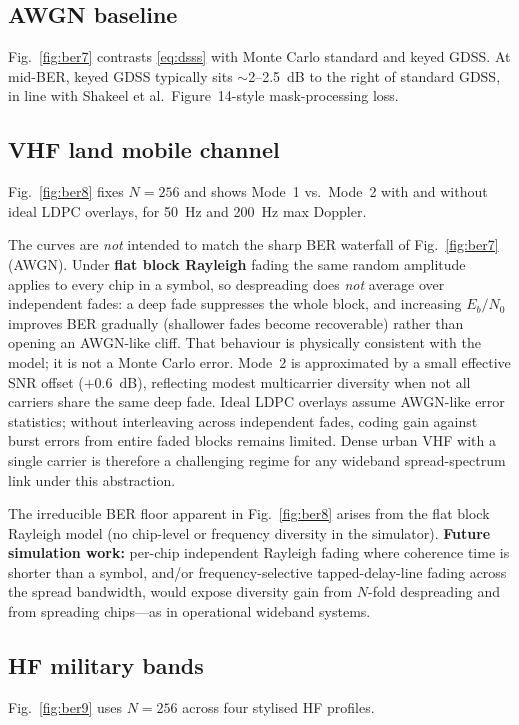 \documentclass[10pt,a4paper,twocolumn]{article}
\begin{document}
\subsection{AWGN baseline}
Fig.~\ref{fig:ber7} contrasts \eqref{eq:dsss} with Monte Carlo standard and keyed GDSS. At mid-BER, keyed GDSS typically sits $\sim$2--2.5~dB to the right of standard GDSS, in line with Shakeel et al.\ Figure~14-style mask-processing loss.

\subsection{VHF land mobile channel}
Fig.~\ref{fig:ber8} fixes $N{=}256$ and shows Mode~1 vs.\ Mode~2 with and without ideal LDPC overlays, for 50~Hz and 200~Hz max Doppler.

The curves are \emph{not} intended to match the sharp BER waterfall of Fig.~\ref{fig:ber7} (AWGN). Under \textbf{flat block Rayleigh} fading the same random amplitude applies to every chip in a symbol, so despreading does \emph{not} average over independent fades: a deep fade suppresses the whole block, and increasing $E_b/N_0$ improves BER gradually (shallower fades become recoverable) rather than opening an AWGN-like cliff. That behaviour is physically consistent with the model; it is not a Monte Carlo error. Mode~2 is approximated by a small effective SNR offset ($+0.6$~dB), reflecting modest multicarrier diversity when not all carriers share the same deep fade. Ideal LDPC overlays assume AWGN-like error statistics; without interleaving across independent fades, coding gain against burst errors from entire faded blocks remains limited. Dense urban VHF with a single carrier is therefore a challenging regime for any wideband spread-spectrum link under this abstraction.

The irreducible BER floor apparent in Fig.~\ref{fig:ber8} arises from the flat block Rayleigh model (no chip-level or frequency diversity in the simulator). \textbf{Future simulation work:} per-chip independent Rayleigh fading where coherence time is shorter than a symbol, and/or frequency-selective tapped-delay-line fading across the spread bandwidth, would expose diversity gain from $N$-fold despreading and from spreading chips---as in operational wideband systems.

\subsection{HF military bands}
Fig.~\ref{fig:ber9} uses $N{=}256$ across four stylised HF profiles.
\end{document}
